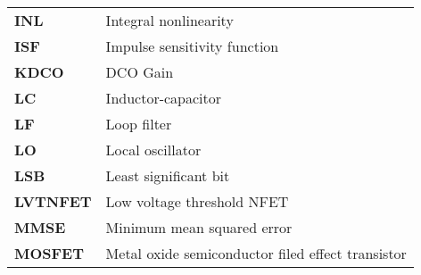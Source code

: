 \begin{table}[htb!]
\begin{tabular}{@{}ll}
		\textbf{\textsf{INL}}	&	Integral nonlinearity \\
		\textbf{\textsf{ISF}}	&	Impulse sensitivity function \\
		\textbf{\textsf{KDCO}}	&	DCO Gain \\
		\textbf{\textsf{LC}}	&	Inductor-capacitor \\
		\textbf{\textsf{LF}}	&	Loop filter \\
		\textbf{\textsf{LO}}	&	Local oscillator \\
		\textbf{\textsf{LSB}}	&	Least significant bit \\
		\textbf{\textsf{LVTNFET}}	&	Low voltage threshold NFET \\
		\textbf{\textsf{MMSE}}	&	Minimum mean squared error \\
		\textbf{\textsf{MOSFET}}	&	Metal oxide semiconductor filed effect transistor \\
	\end{tabular}
	\end{table}
